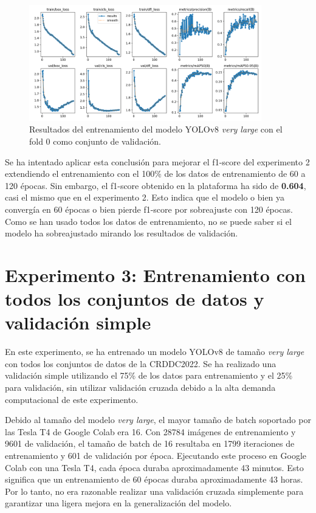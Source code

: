 \begin{figure}[H]
    \centering
    \includegraphics[width=0.9\textwidth]{img/exp2b-results.png}
    \caption{Resultados del entrenamiento del modelo YOLOv8 \textit{very large} con el fold 0 como conjunto de validación.}
    \label{fig:exp2b-results}
\end{figure}

Se ha intentado aplicar esta conclusión para mejorar el f1-score del experimento 2 extendiendo el entrenamiento con el 100\% de los datos de entrenamiento de 60 a 120 épocas. Sin embargo, el f1-score obtenido en la plataforma ha sido de \textbf{0.604}, casi el mismo que en el experimento 2. Esto indica que el modelo o bien ya convergía en 60 épocas o bien pierde f1-score por sobreajuste con 120 épocas. Como se han usado todos los datos de entrenamiento, no se puede saber si el modelo ha sobreajustado mirando los resultados de validación.


\section{Experimento 3: Entrenamiento con todos los conjuntos de datos y validación simple}\label{SEC:EXP3}

En este experimento, se ha entrenado un modelo YOLOv8 de tamaño \textit{very large} con todos los conjuntos de datos de la CRDDC2022. Se ha realizado una validación simple utilizando el 75\% de los datos para entrenamiento y el 25\% para validación, sin utilizar validación cruzada debido a la alta demanda computacional de este experimento.

Debido al tamaño del modelo \textit{very large}, el mayor tamaño de batch soportado por las Tesla T4 de Google Colab era 16. Con 28784 imágenes de entrenamiento y 9601 de validación, el tamaño de batch de 16 resultaba en 1799 iteraciones de entrenamiento y 601 de validación por época. Ejecutando este proceso en Google Colab con una Tesla T4, cada época duraba aproximadamente 43 minutos. Esto significa que un entrenamiento de 60 épocas duraba aproximadamente 43 horas. Por lo tanto, no era razonable realizar una validación cruzada simplemente para garantizar una ligera mejora en la generalización del modelo.

